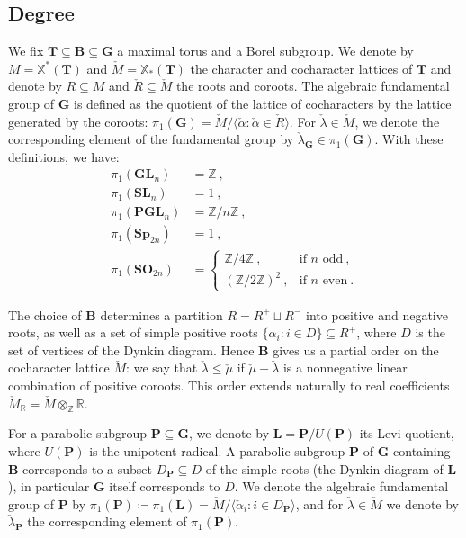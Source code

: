 \documentclass[10pt, a4paper]{amsart}
\theoremstyle{definition}
\theoremstyle{myitemstyle}
\newcommand{\R}{\mathbb{R}}
\newcommand{\Z}{\mathbb{Z}}
\newcommand{\RR}{\mathbb{R}}
\newcommand{\Mcheck}{{\check{M}}}
\newcommand{\lambdacheck}{\check{\lambda}}
\newcommand{\mucheck}{\check{\mu}}
\newcommand{\Rcheck}{\check{R}}
\newcommand{\alphacheck}{\check{\alpha}}
\newcommand{\bfG}{\mathbf{G}}
\newcommand{\bfT}{\mathbf{T}}
\newcommand{\bfL}{\mathbf{L}}
\newcommand{\bfP}{\mathbf{P}}
\newcommand{\bfB}{\mathbf{B}}
\newcommand{\bGL}{\mathbf{GL}}
\newcommand{\bPGL}{\mathbf{PGL}}
\begin{document}
\subsection{Degree}



We fix $\bfT\subseteq \mathbf{B}\subseteq \bfG$ a maximal torus and a Borel subgroup. We denote by $M = \mathbb{X}^*(\bfT)$ and $\Mcheck = \mathbb{X}_{*}(\bfT)$ the character and cocharacter lattices of $\bfT$ and denote by $R\subseteq M$ and $\check{R}\subseteq \Mcheck$ the roots and coroots. The algebraic fundamental group of $\mathbf G$ is defined as the quotient of the lattice of cocharacters by the lattice generated by the coroots: $\pi_1(\bfG) = \Mcheck / \langle \alphacheck: \alphacheck \in \Rcheck \rangle$. For $\lambdacheck\in \Mcheck$, we denote the corresponding element of the fundamental group by $\lambdacheck_\bfG\in \pi_1(\bfG)$. With these definitions, we have:
\begin{equation*}\begin{split}
\pi_1(\bGL_n) &= \Z \ , \\ 
\pi_1(\mathbf{SL}_n) &= 1 \ , \\ 
\pi_1(\bPGL_n) &= \Z / n\Z \ , \\
\pi_1(\mathbf{Sp}_{2n}) &= 1 \ , \\
\pi_1(\mathbf{SO}_{2n}) &= \begin{cases} \Z / 4\Z \ , & \text{if }n\mbox{ odd}\ , \\
 (\Z / 2\Z)^2 \ , & \text{if }n\mbox{ even} \ .
 \end{cases}
 \end{split}
\end{equation*}

The choice of $\mathbf{B}$ determines a partition $R=R^+\sqcup R^-$ into positive and negative roots, as well as a set of simple positive roots $\{\alpha_i:i\in D\}\subseteq R^+$, where $D$ is the set of vertices of the Dynkin diagram. Hence $\mathbf B$ gives us a partial order on the cocharacter lattice $\Mcheck$: we say that $\lambdacheck \leq \mucheck$ if $\mucheck - \lambdacheck$ is a nonnegative linear combination of positive coroots. This order extends naturally to real coefficients $\Mcheck_\RR = \Mcheck \otimes_\Z \R.$ 

For a parabolic subgroup $\mathbf{P} \subseteq \bfG$, we denote by $\bfL = \bfP/U(\bfP)$ its Levi quotient, where $U(\bfP)$ is the unipotent radical.
A parabolic subgroup $\bfP$ of $\bfG$ containing $\bfB$ corresponds to a subset $D_\bfP\subseteq D$ of the simple roots (the Dynkin diagram of $\bfL$), in particular $\bfG$ itself corresponds to $D$. We denote the algebraic fundamental group of $\bfP$ by $\pi_1(\bfP) \coloneqq \pi_1(\bfL) = \Mcheck/\langle \check{\alpha}_i:i\in D_\bfP\rangle$, and for $\lambdacheck\in \Mcheck$ we denote by $\lambdacheck_\bfP$ the corresponding element of $\pi_1(\bfP)$. 
\end{document}
